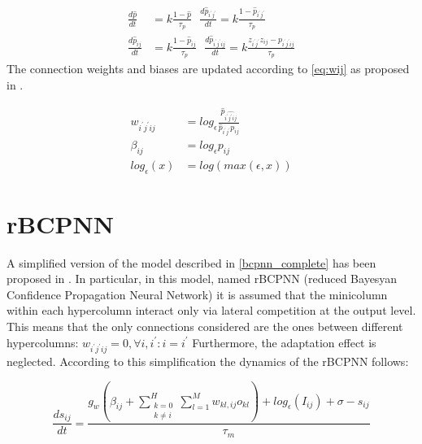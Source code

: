 \begin{equation}
   \begin{aligned}
   \frac{d \hat p}{dt}  & = k \frac{1-\hat p}{\tau_p} \ \ \ 
   \frac{d \hat p_{i^{\prime}j^{\prime}}}{dt}  = k \frac{1-\hat p_{i^{\prime}j^{\prime}}}{\tau_p} \\
   \frac{d \hat p_{ij}}{dt}  &= k \frac{1-\hat p_{ij}}{\tau_p} \ \ \ 
   \frac{d \hat p_{i^{\prime}j^{\prime}ij}}{dt}  = k \frac{z_{i^{\prime}j^{\prime}}z_{ij} - p_{i^{\prime}j^{\prime}ij}}{\tau_p} 
   \end{aligned}
    \label{eq:pij}
\end{equation}
The connection weights and biases are updated according to \eqref{eq:wij} as proposed in \cite{sandberg2002bayesian}.

\begin{equation}
    \begin{aligned}
    w_{i^{\prime}j^{\prime}ij} &= log_{\epsilon} \frac{\hat{p}_{ \hat{{i^{\prime}j^{\prime}ij}}}}{\hat{p}_{i^{\prime}j^{\prime}}p_{ij}} \\
    \beta_{ij} &= log_{\epsilon} p_{ij} \\
    log_{\epsilon}(x) & = log(max(\epsilon,x))
    \end{aligned}
    \label{eq:wij}
\end{equation}


\section{rBCPNN}
\label{rBCPNN}
A simplified version of the model described in \cref{bcpnn_complete} has been proposed in \cite{johansson2006clustering}. In particular, in this model, named rBCPNN (reduced Bayesyan Confidence Propagation Neural Network) it is assumed that the minicolumn within each hypercolumn interact only via lateral competition at the output level. This means that the only connections considered are the ones between different hypercolumns: $w_{i^{\prime}j^{\prime}ij}=0, \forall i, i^{\prime}: i = i^\prime$ Furthermore, the adaptation effect is neglected. According to this simplification the dynamics of the rBCPNN follows:

\begin{equation}
    \frac{ds_{ij}}{dt} = \frac{g_w(\beta_{ij}+\sum\limits_{\substack{k=0 \\ k\neq i}}^H\sum\limits_{l=1}^M w_{kl,ij}o_{kl})+log_\epsilon(I_{ij})+\sigma-s_{ij}}{\tau_m} 
    \label{eq:sij_reduced}
\end{equation}


